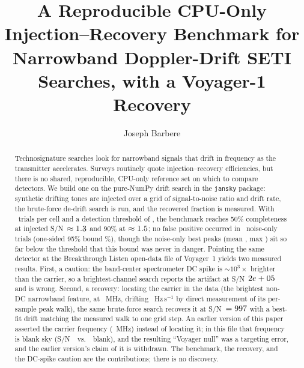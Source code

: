 \documentclass[twocolumn]{aastex631}
\newcommand{\code}[1]{\texttt{#1}}
\begin{document}
\title{A Reproducible CPU-Only Injection--Recovery Benchmark for Narrowband Doppler-Drift
SETI Searches, with a Voyager-1 Recovery}

\author[0009-0008-3289-4447]{Joseph Barbere}

\begin{abstract}
Technosignature searches look for narrowband signals that drift in frequency as the transmitter
accelerates. Surveys routinely quote injection--recovery efficiencies, but there is no shared,
reproducible, CPU-only reference set on which to compare detectors. We build one on the pure-NumPy
drift search in the \code{jansky} package: synthetic drifting tones are injected over a grid of
signal-to-noise ratio and drift rate, the brute-force de-drift search is run, and the recovered
fraction is measured. With \dsNtrials\ trials per cell and a detection threshold of \dsThreshold, the benchmark
reaches 50\% completeness at injected S/N~$\approx1.3$ and 90\% at $\approx1.5$; no
false positive occurred in \dsFprTrials\ noise-only trials (one-sided 95\% bound \dsFprBound\%),
though the noise-only best peaks (mean \dsNoiseMean, max \dsNoiseMax) sit so far below the
threshold that this bound was never in danger. Pointing the same detector at the Breakthrough
Listen open-data file of Voyager~1 \citep{lebofsky2019} yields two measured results. First, a
caution: the band-center spectrometer DC spike is $\sim10^{3}\times$ brighter than the carrier,
so a brightest-channel search reports the artifact at S/N~$2e+05$ and is wrong. Second, a
recovery: locating the carrier in the data (the brightest non-DC narrowband feature, at
\dsVoyFreq~MHz, drifting \dsVoyDriftHz~Hz\,s$^{-1}$ by direct measurement of its per-sample peak
walk), the same brute-force search recovers it at S/N~$=997$ with a best-fit drift matching
the measured walk to one grid step. An earlier version of this paper asserted the carrier frequency
(\dsVoyLegacyFreq~MHz) instead of locating it; in this file that frequency is blank sky
(S/N~\dsVoyLegacySnr\ vs.\ \dsVoyBlankSnr\ blank), and the resulting ``Voyager null'' was a
targeting error, and the earlier version's claim of it is withdrawn. The benchmark, the
recovery, and the DC-spike caution are the
contributions; there is no discovery.
\end{abstract}

\end{document}
